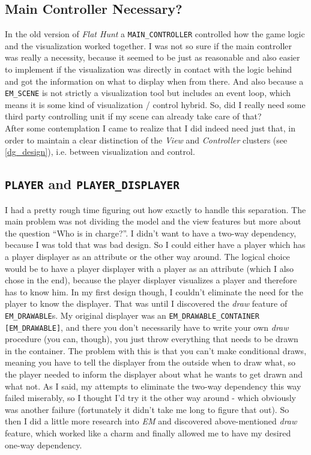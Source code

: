 \subsection{Main Controller Necessary?}
In the old version of \emph{Flat Hunt} a \texttt{MAIN\_CONTROLLER} controlled how the game logic and the visualization worked together. I was not so sure if the main controller was really a necessity, because it seemed to be just as reasonable and also easier to implement if the visualization was directly in contact with the logic behind and got the information on what to display when from there. And also because a \texttt{EM\_SCENE} is not strictly a visualization tool but includes an event loop, which means it is some kind of visualization / control hybrid. So, did I really need some third party controlling unit if my scene can already take care of that?\\
After some contemplation I came to realize that I did indeed need just that, in order to maintain a clear distinction of the \emph{View} and \emph{Controller} clusters (see \autoref{dg_design}), i.e. between visualization and control. 

\subsection{\texttt{PLAYER} and \texttt{PLAYER\_DISPLAYER}}
I had a pretty rough time figuring out how exactly to handle this separation. The main problem was not dividing the model and the view features but more about the question ``Who is in charge?''. I didn't want to have a two-way dependency, because I was told that was bad design. So I could either have a player which has a player displayer as an attribute or the other way around. The logical choice would be to have a player displayer with a player as an attribute (which I also chose in the end), because the player displayer visualizes a player and therefore has to know him. In my first design though, I couldn't eliminate the need for the player to know the displayer. That was until I discovered the \textit{draw} feature of \texttt{EM\_DRAWABLE}s. My original displayer was an \texttt{EM\_DRAWABLE\_CONTAINER [EM\_DRAWABLE]}, and there you don't necessarily have to write your own \textit{draw} procedure (you can, though), you just throw everything that needs to be drawn in the container. The problem with this is that you can't make conditional draws, meaning you have to tell the displayer from the outside when to draw what, so the player needed to inform the displayer about what he wants to get drawn and what not. As I said, my attempts to eliminate the two-way dependency this way failed miserably, so I thought I'd try it the other way around - which obviously was another failure (fortunately it didn't take me long to figure that out). So then I did a little more research into \emph{EM} and discovered above-mentioned \textit{draw} feature, which worked like a charm and finally allowed me to have my desired one-way dependency.

